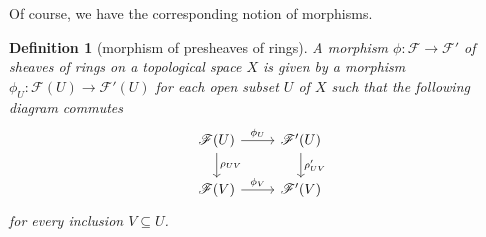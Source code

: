 \documentclass[12pt]{scrartcl}
\newtheorem{definition}[proposition]{Definition}
\begin{document}
Of course, we have the corresponding notion of morphisms.

\begin{definition}[morphism of presheaves of rings]
	A morphism $\phi: \mathscr{F} \rightarrow \mathscr{F}'$ of sheaves of rings on a topological space $X$ is given by a morphism $\phi_U: \mathscr{F}(U) \rightarrow \mathscr{F}'(U)$ for each open subset $U$ of $X$ such that  the following diagram commutes
	\[
	\begin{tikzcd}
	\mathscr{F}(U) \arrow[r, "\phi_U"] \arrow[d, "\rho_{UV}"] & \mathscr{F}'(U) \arrow[d, "\rho'_{UV}"] \\
	\mathscr{F}(V) \arrow[r, "\phi_V"] & \mathscr{F}'(V) 
	\end{tikzcd}
	\]
	for every inclusion $V \subseteq U$.
\end{definition}
\end{document}
